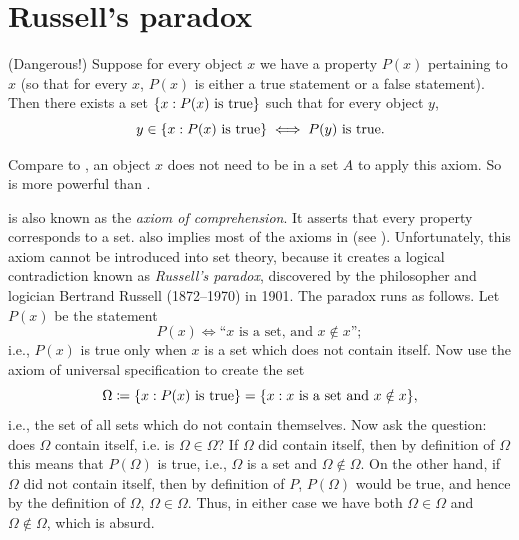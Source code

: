 \section{Russell's paradox}\label{i:sec:3.2}

\begin{ax}\label{i:3.8}
  (Dangerous!)
  Suppose for every object \(x\) we have a property \(P(x)\) pertaining to \(x\) (so that for every \(x\), \(P(x)\) is either a true statement or a false statement).
  Then there exists a set \(\left\lbrace x : P(x) \text{ is true}\right\rbrace\) such that for every object \(y\),
  \[
    y \in \left\lbrace x : P(x) \text{ is true}\right\rbrace \iff P(y) \text{ is true}.
  \]
\end{ax}

\begin{note}
  Compare to , an object \(x\) does not need to be in a set \(A\) to apply this axiom.
  So  is more powerful than .
\end{note}

\begin{note}
   is also known as the \emph{axiom of comprehension}.
  It asserts that every property corresponds to a set.
   also implies most of the axioms in  (see ).
  Unfortunately, this axiom cannot be introduced into set theory, because it creates a logical contradiction known as \emph{Russell's paradox}, discovered by the philosopher and logician Bertrand Russell (1872--1970) in 1901.
  The paradox runs as follows.
  Let \(P(x)\) be the statement
  \[
    P(x) \iff \text{``\(x\) is a set, and \(x \notin x\)''};
  \]
  i.e., \(P(x)\) is true only when \(x\) is a set which does not contain itself.
  Now use the axiom of universal specification to create the set
  \[
    \Omega \coloneqq \set{x : P(x) \text{ is true}} = \set{x : x \text{ is a set and } x \notin x},
  \]
  i.e., the set of all sets which do not contain themselves.
  Now ask the question: does \(\Omega\) contain itself, i.e. is \(\Omega \in \Omega\)?
  If \(\Omega\) did contain itself, then by definition of \(\Omega\) this means that \(P(\Omega)\) is true, i.e., \(\Omega\) is a set and \(\Omega \notin \Omega\).
  On the other hand, if \(\Omega\) did not contain itself, then by definition of \(P\), \(P(\Omega)\) would be true, and hence by the definition of \(\Omega\), \(\Omega \in \Omega\).
  Thus, in either case we have both \(\Omega \in \Omega\) and \(\Omega \notin \Omega\), which is absurd.
\end{note}

